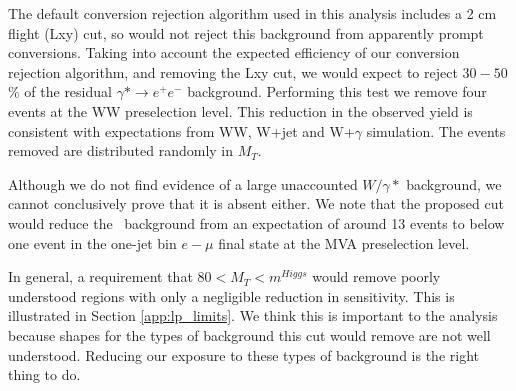 The default conversion rejection algorithm used in this analysis
includes a 2 cm flight (Lxy) cut, so would not reject this background
from apparently prompt conversions.
Taking into account the expected efficiency of our conversion
rejection algorithm, and removing the Lxy cut, 
we would expect to reject $30-50$\% of the residual 
$\gamma*\rightarrow e^{+}e^{-}$ background.
Performing this test we remove four events at the WW preselection level.
This reduction in the observed yield is consistent with expectations
from WW, W+jet and W+$\gamma$ simulation.
The events removed are distributed randomly in $M_T$.

Although we do not find evidence of a large unaccounted $W/\gamma*$ background,
we cannot conclusively prove that it is absent either.
We note that the proposed cut would reduce the \dytt~background from an expectation
of around 13 events to below one event in the one-jet bin $e-\mu$ final state at
the MVA preselection level.

In general, a requirement that $80 < M_T < m^{Higgs}$ would remove poorly
understood regions with only a negligible reduction in sensitivity.
This is illustrated in Section \ref{app:lp_limits}.
We think this is important to the analysis because shapes for the types of background
this cut would remove are not well understood. Reducing our exposure to these types of 
background is the right thing to do.

